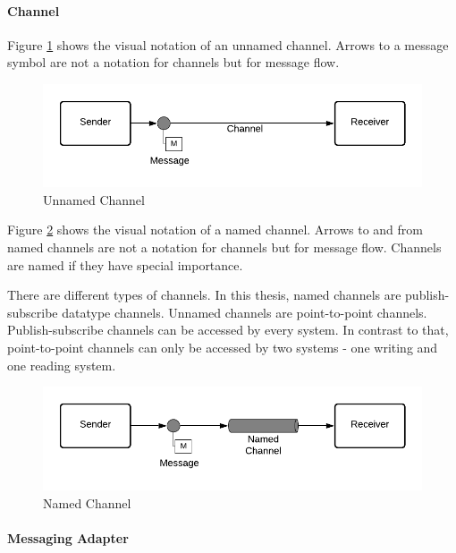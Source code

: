 \paragraph{Channel}

Figure \ref{messaging:channel1} shows the visual notation of an unnamed channel. Arrows to a message symbol are not a notation for channels but for message flow.

\begin{figure}[H]
    \centering
    \includegraphics[scale=0.6]{Diagrams/Messaging/3. Channel.pdf}
    \caption{Unnamed Channel}
    \label{messaging:channel1}
\end{figure}

Figure \ref{messaging:channel2} shows the visual notation of a named channel. Arrows to and from named channels are not a notation for channels but for message flow. Channels are named if they have special importance.

There are different types of channels. In this thesis, named channels are publish-subscribe datatype channels. Unnamed channels are point-to-point channels. Publish-subscribe channels can be accessed by every system. In contrast to that, point-to-point channels can only be accessed by two systems - one writing and one reading system.

\begin{figure}[H]
    \centering
    \includegraphics[scale=0.6]{Diagrams/Messaging/2. Channel.pdf}
    \caption{Named Channel}
    \label{messaging:channel2}
\end{figure}

\paragraph{Messaging Adapter}

